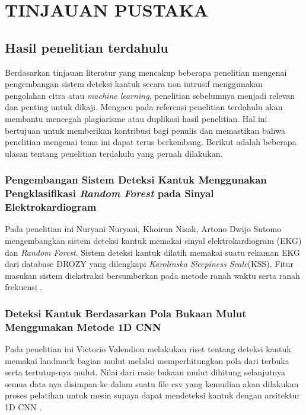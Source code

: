 \chapter{TINJAUAN PUSTAKA}
\label{chap:tinjauanpustaka}


\section{Hasil penelitian terdahulu}

Berdasarkan tinjauan literatur yang mencakup beberapa penelitian mengenai pengembangan
sistem deteksi kantuk secara non intrusif menggunakan pengolahan citra atau \emph{machine learning},
penelitian sebelumnya menjadi relevan dan penting untuk dikaji. Mengacu pada referensi penelitian
terdahulu akan membantu mencegah plagiarisme atau duplikasi hasil penelitian. Hal ini
bertujuan untuk memberikan kontribusi bagi penulis dan memastikan bahwa penelitian
mengenai tema ini dapat terus berkembang. Berikut adalah beberapa ulasan tentang
penelitian terdahulu yang pernah dilakukan.

\subsection{Pengembangan Sistem Deteksi Kantuk Menggunakan Pengklasifikasi \emph{Random Forest} pada Sinyal Elektrokardiogram}
Pada penelitian ini Nuryani Nuryani, Khoirun Nisak, Artono Dwijo Sutomo mengembangkan   sistem   deteksi   kantuk
memakai   sinyal elektrokardiogram  (EKG)  dan \emph{Random  Forest}. Sistem  deteksi kantuk   dilatih   memakai suatu
rekaman   EKG   dari database DROZY yang dilengkapi \emph{Karolinska Sleepiness Scale}(KSS). Fitur masukan  sistem  diekstraksi
bersumberkan pada  metode ranah waktu serta ranah frekuensi \parencite{9}.

\subsection{Deteksi Kantuk Berdasarkan Pola Bukaan Mulut Menggunakan Metode 1D CNN}
Pada penelitian ini Victorio Valendion melakukan riset tentang deteksi kantuk memakai landmark bagian mulut melalui
memperhitungkan pola dari terbuka serta tertutup-nya mulut. Nilai dari rasio bukaan mulut dihitung selanjutnya
semua data nya disimpan ke dalam suatu file csv yang kemudian akan dilakukan proses pelatihan untuk mesin
supaya dapat mendeteksi kantuk dengan arsitektur 1D CNN \parencite{10}.

